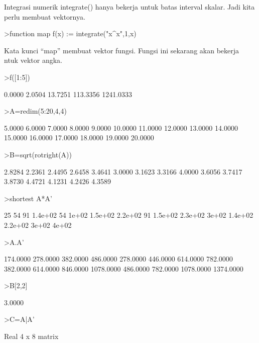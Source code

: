 \documentclass{article}
\begin{document}
\begin{eulernotebook}
\begin{eulercomment}
Integrasi numerik integrate() hanya bekerja untuk batas interval
skalar. Jadi kita perlu membuat vektornya.
\end{eulercomment}
\begin{eulerprompt}
>function map f(x) := integrate("x^x",1,x)
\end{eulerprompt}
\begin{eulercomment}
Kata kunci “map” membuat vektor fungsi. Fungsi ini sekarang akan
bekerja\\
ntuk vektor angka.
\end{eulercomment}
\begin{eulerprompt}
>f([1:5])
\end{eulerprompt}
\begin{euleroutput}
       0.0000      2.0504     13.7251    113.3356   1241.0333 
\end{euleroutput}
\begin{eulerprompt}
>A=redim(5:20,4,4)
\end{eulerprompt}
\begin{euleroutput}
       5.0000      6.0000      7.0000      8.0000 
       9.0000     10.0000     11.0000     12.0000 
      13.0000     14.0000     15.0000     16.0000 
      17.0000     18.0000     19.0000     20.0000 
\end{euleroutput}
\begin{eulerprompt}
>B=sqrt(rotright(A))
\end{eulerprompt}
\begin{euleroutput}
       2.8284      2.2361      2.4495      2.6458 
       3.4641      3.0000      3.1623      3.3166 
       4.0000      3.6056      3.7417      3.8730 
       4.4721      4.1231      4.2426      4.3589 
\end{euleroutput}
\begin{eulerprompt}
>shortest A*A'
\end{eulerprompt}
\begin{euleroutput}
      25     54     91 1.4e+02 
      54  1e+02 1.5e+02 2.2e+02 
      91 1.5e+02 2.3e+02  3e+02 
  1.4e+02 2.2e+02  3e+02  4e+02 
\end{euleroutput}
\begin{eulerprompt}
>A.A'
\end{eulerprompt}
\begin{euleroutput}
     174.0000    278.0000    382.0000    486.0000 
     278.0000    446.0000    614.0000    782.0000 
     382.0000    614.0000    846.0000   1078.0000 
     486.0000    782.0000   1078.0000   1374.0000 
\end{euleroutput}
\begin{eulerprompt}
>B[2,2]
\end{eulerprompt}
\begin{euleroutput}
       3.0000 
\end{euleroutput}
\begin{eulerprompt}
>C=A|A'
\end{eulerprompt}
\begin{euleroutput}
  Real 4 x 8 matrix
  

\end{euleroutput}
\end{eulernotebook}
\end{document}
